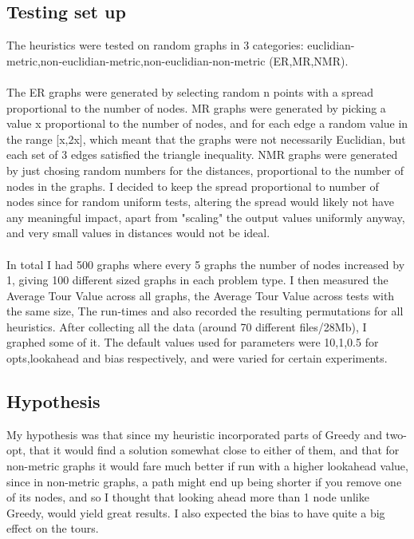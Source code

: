 \documentclass{report}
\begin{document}
\subsection{Testing set up}
The heuristics were tested on random graphs in 3 categories: euclidian-metric,non-euclidian-metric,non-euclidian-non-metric (ER,MR,NMR).\\\\
The ER graphs were generated by selecting random n points with a spread proportional to the number of nodes. MR graphs were generated by picking a value x proportional to the number of nodes, and for each edge a random value in the range [x,2x], which meant that the graphs were not necessarily Euclidian, but each set of 3 edges satisfied the triangle inequality. NMR graphs were generated by just chosing random numbers for the distances, proportional to the number of nodes in the graphs. I decided to keep the spread proportional to number of nodes since for random uniform tests, altering the spread would likely not have any meaningful impact, apart from "scaling" the output values uniformly anyway, and very small values in distances would not be ideal.\\\\
In total I had 500 graphs where every 5 graphs the number of nodes increased by 1, giving 100 different sized graphs in each problem type.
I then measured the Average Tour Value across all graphs, the Average Tour Value across tests with the same size, The run-times and also recorded the resulting permutations for all heuristics. After collecting all the data (around 70 different files/28Mb), I graphed some of it. The default values used for parameters were 10,1,0.5 for opts,lookahead and bias respectively, and were varied for certain experiments.

\subsection{Hypothesis}
My hypothesis was that since my heuristic incorporated parts of Greedy and two-opt, that it would find a solution somewhat close to either of them, and that for non-metric graphs it would fare much better if run with a higher lookahead value, since in non-metric graphs, a path might end up being shorter if you remove one of its nodes, and so I thought that looking ahead more than 1 node unlike Greedy, would yield great results. I also expected the bias to have quite a big effect on the tours.
\end{document}
